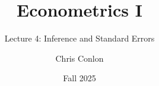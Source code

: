 





















\title[L4 - Inference and Standard Errors]{ Econometrics I}
\subtitle{Lecture 4: Inference and Standard Errors}
\author{Chris Conlon}
\date{Fall 2025}
\maketitle


